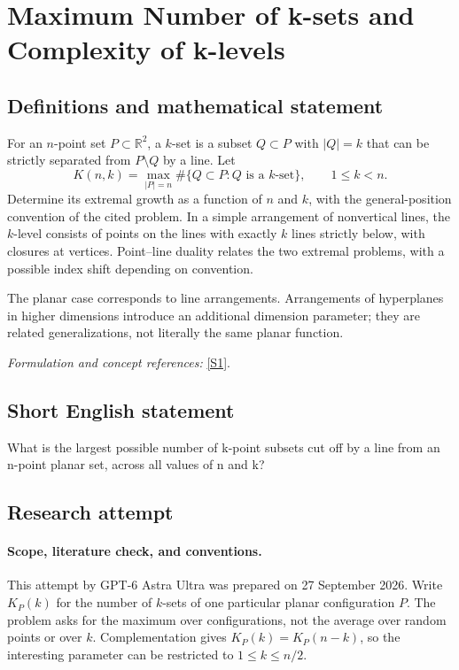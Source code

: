 \documentclass[11pt]{article}
\begin{document}
\section*{\texorpdfstring{Maximum Number of k-sets and Complexity of k-levels}{Maximum Number of k-sets and Complexity of k-levels}}\label{479}
\subsection{Definitions and mathematical statement}
For an $n$-point set $P\subset{\mathbb{R}}^2$, a $k$-set is a subset $Q\subset P$ with $|Q|=k$ that can be strictly separated from $P\setminus Q$ by a line. Let
\[
 K(n,k)=\max_{|P|=n}\#\{Q\subset P:Q\text{ is a }k\text{-set}
                                      \},\qquad1\le k<n.
\]
Determine its extremal growth as a function of $n$ and $k$, with the general-position convention of the cited problem. In a simple arrangement of nonvertical lines, the $k$-level consists of points on the lines with exactly $k$ lines strictly below, with closures at vertices. Point--line duality relates the two extremal problems, with a possible index shift depending on convention.

The planar case corresponds to line arrangements. Arrangements of hyperplanes in higher dimensions introduce an additional dimension parameter; they are related generalizations, not literally the same planar function.
\par\smallskip\textit{Formulation and concept references:} \href{https://topp.openproblem.net/p7}{[S1]}.

\subsection{Short English statement}
What is the largest possible number of k-point subsets cut off by a line from an n-point planar set, across all values of n and k?
\subsection{Research attempt}
\paragraph{Scope, literature check, and conventions.}
This attempt by GPT-6 Astra Ultra was prepared on 27 September 2026.
Write $K_P(k)$ for the number of $k$-sets of one particular planar
configuration $P$. The problem asks for the maximum over configurations,
not the average over random points or over $k$. Complementation gives
$K_P(k)=K_P(n-k)$, so the interesting parameter can be restricted to
$1\leq k\leq n/2$.
\end{document}
